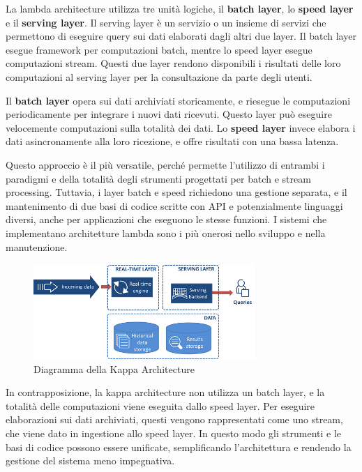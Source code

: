 \documentclass[italian,a4paper, twoside, 12pt]{report}
\begin{document}
La lambda architecture utilizza tre unità logiche, il \textbf{batch
layer}, lo \textbf{speed layer} e il \textbf{serving layer}. Il serving
layer è un servizio o un insieme di servizi che permettono di eseguire
query sui dati elaborati dagli altri due layer. Il batch layer esegue
framework per computazioni batch, mentre lo speed layer esegue
computazioni stream. Questi due layer rendono disponibili i risultati
delle loro computazioni al serving layer per la consultazione da parte
degli utenti.

Il \textbf{batch layer} opera sui dati archiviati storicamente, e
riesegue le computazioni periodicamente per integrare i nuovi dati
ricevuti. Questo layer può eseguire velocemente computazioni sulla
totalità dei dati. Lo \textbf{speed layer} invece elabora i dati
asincronamente alla loro ricezione, e offre risultati con una bassa
latenza.

Questo approccio è il più versatile, perché permette l'utilizzo di
entrambi i paradigmi e della totalità degli strumenti progettati per
batch e stream processing. Tuttavia, i layer batch e speed richiedono
una gestione separata, e il mantenimento di due basi di codice scritte
con API e potenzialmente linguaggi diversi, anche per applicazioni che
eseguono le stesse funzioni. I sistemi che implementano architetture
lambda sono i più onerosi nello sviluppo e nella manutenzione.

\begin{figure}
\centering
\includegraphics[width=0.75000\textwidth]{img/kappa_architecture.png}
\caption{Diagramma della Kappa Architecture}
\end{figure}

In contrapposizione, la kappa architecture non utilizza un batch layer,
e la totalità delle computazioni viene eseguita dallo speed layer. Per
eseguire elaborazioni sui dati archiviati, questi vengono rappresentati
come uno stream, che viene dato in ingestione allo speed layer. In
questo modo gli strumenti e le basi di codice possono essere unificate,
semplificando l'architettura e rendendo la gestione del sistema meno
impegnativa.
\end{document}
